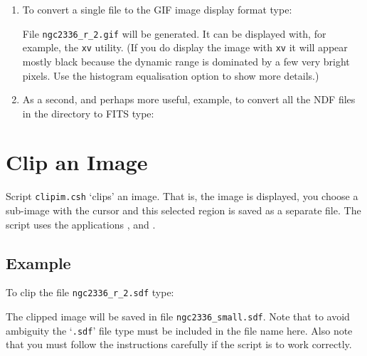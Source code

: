 \documentclass[twoside,11pt]{starlink}
\begin{document}
\begin{enumerate}

  \item To convert a single file to the GIF image display format type:

\begin{terminalv}
\end{terminalv}

   File \texttt{ngc2336\_r\_2.gif} will be generated.  It can be displayed
   with, for example, the \texttt{xv} utility.  (If you do display the image
   with \texttt{xv} it will appear mostly black because the dynamic range
   is dominated by a few very bright pixels.  Use the histogram
   equalisation option to show more details.)

  \item As a second, and perhaps more useful, example, to convert all the
   NDF files in the directory to FITS type:

\begin{terminalv}
\end{terminalv}

\end{enumerate}





\newpage
\section{\label{CLIPIM}Clip an Image}

Script \texttt{clipim.csh} `clips' an image.  That is, the image is
displayed, you choose a sub-image with the cursor and this selected
region is saved as a separate file.  The script uses the 
applications ,
 and .

\subsection*{Example}

To clip the file \texttt{ngc2336\_r\_2.sdf} type:

\begin{terminalv}
\end{terminalv}

The clipped image will be saved in file \texttt{ngc2336\_small.sdf}.  Note
that to avoid ambiguity the `\texttt{.sdf}' file type must be included in
the file name here.  Also note that you must follow the instructions
carefully if the script is to work correctly.
\end{document}
